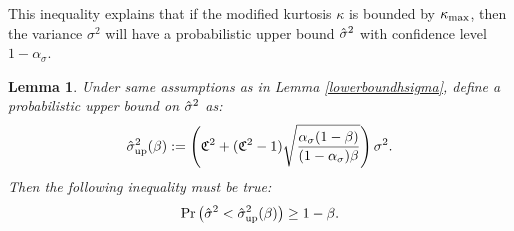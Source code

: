 \documentclass{iitthesis}
\newtheorem{lemma}[theorem]{Lemma}
\theoremstyle{definition}
\begin{document}
This inequality explains that if the modified kurtosis $\kappa$ is bounded by $\kappa_{\max}$, then the variance $\sigma^2$ will have a probabilistic upper bound $\hat{\sigma}^2$ with confidence level $1-\alpha_{\sigma}$.
\begin{lemma}\label{upperboundhsigma}
Under same assumptions as in Lemma \ref{lowerboundhsigma}, define a probabilistic upper bound on $\hat{\sigma}^2$ as:
\begin{align}\label{sigup}
\hat{\sigma}_{\operatorname{up}}^2 (\beta) := \left(\mathfrak{C}^2+(\mathfrak{C}^2-1)\sqrt{\frac{\alpha_{\sigma}(1-\beta)}{(1-\alpha_{\sigma})\beta}}\right)\sigma^2.
\end{align}
Then the following inequality must be true: 
\begin{align}\label{hsighsigupineq}
\Pr\left(\hat{\sigma}^2 <\hat{\sigma}_{\operatorname{up}}^2(\beta)\right) \geq 1-\beta.
\end{align}
\end{lemma}
\end{document}
